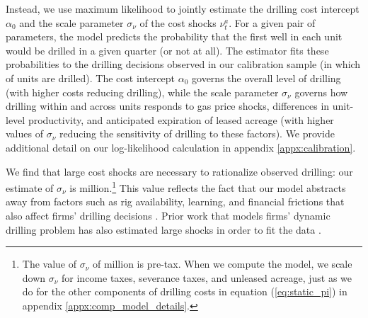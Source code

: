 \documentclass[12pt]{article}
\begin{document}

Instead, we use maximum likelihood to jointly estimate the drilling cost intercept $\alpha_0$ and the scale parameter $\sigma_{\nu}$ of the cost shocks $\nu^{a}_t$. For a given pair of parameters, the model predicts the probability that the first well in each unit would be drilled in a given quarter (or not at all). The estimator fits these probabilities to the drilling decisions observed in our calibration sample (in which of units are drilled). The cost intercept $\alpha_0$ governs the overall level of drilling (with higher costs reducing drilling), while the scale parameter $\sigma_{\nu}$ governs how drilling within and across units responds to gas price shocks, differences in unit-level productivity, and anticipated expiration of leased acreage (with higher values of $\sigma_{\nu}$ reducing the sensitivity of drilling to these factors). We provide additional detail on our log-likelihood calculation in appendix \ref{appx:calibration}.

We find that large cost shocks are necessary to rationalize observed drilling: our estimate of $\sigma_{\nu}$ is million.\footnote{The value of $\sigma_{\nu}$ of million is pre-tax. When we compute the model, we scale down $\sigma_{\nu}$ for income taxes, severance taxes, and unleased acreage, just as we do for the other components of drilling costs in equation (\ref{eq:static_pi}) in appendix \ref{appx:comp_model_details}.} This value reflects the fact that our model abstracts away from factors such as rig availability, learning, and financial frictions that also affect firms' drilling decisions \citep{bib:covert,bib:agerton,bib:fetter_etal,bib:hodgson,bib:steck,bib:gilje}. Prior work that models firms' dynamic drilling problem has also estimated large shocks in order to fit the data \citep{bib:kellogg,bib:agerton}. 
\end{document}

